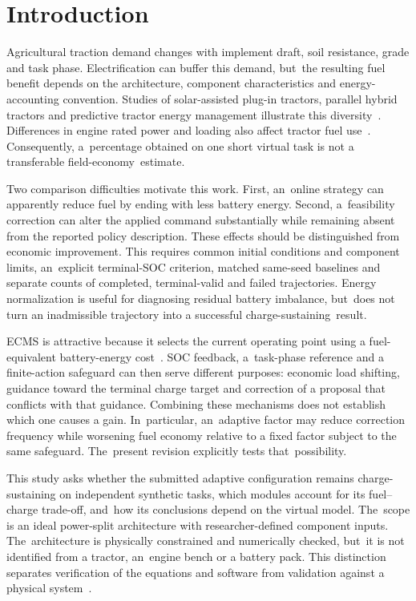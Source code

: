 \documentclass[energies,article,submit,moreauthors]{Definitions/mdpi}
\begin{document}
\section{Introduction}
Agricultural traction demand changes with implement draft, soil resistance, grade and task phase. Electrification can buffer this demand, but~the resulting fuel benefit depends on the architecture, component characteristics and energy-accounting convention. Studies of solar-assisted plug-in tractors, parallel hybrid tractors and predictive tractor energy management illustrate this diversity~\cite{mousazadeh2011,mocera2020,curiel2023}. Differences in engine rated power and loading also affect tractor fuel use~\cite{jilek2008,janulevicius2010}. Consequently, a~percentage obtained on one short virtual task is not a transferable field-economy~estimate.

Two comparison difficulties motivate this work. First, an~online strategy can apparently reduce fuel by ending with less battery energy. Second, a~feasibility correction can alter the applied command substantially while remaining absent from the reported policy description. These effects should be distinguished from economic improvement. This requires common initial conditions and component limits, an~explicit terminal-SOC criterion, matched same-seed baselines and separate counts of completed, terminal-valid and failed trajectories. Energy normalization is useful for diagnosing residual battery imbalance, but~does not turn an inadmissible trajectory into a successful charge-sustaining~result.

ECMS is attractive because it selects the current operating point using a fuel-equivalent battery-energy cost~\cite{musardo2005}. SOC feedback, a~task-phase reference and a finite-action safeguard can then serve different purposes: economic load shifting, guidance toward the terminal charge target and correction of a proposal that conflicts with that guidance. Combining these mechanisms does not establish which one causes a gain. In~particular, an~adaptive factor may reduce correction frequency while worsening fuel economy relative to a fixed factor subject to the same safeguard. The~present revision explicitly tests that~possibility.

This study asks whether the submitted adaptive configuration remains charge-sustaining on independent synthetic tasks, which modules account for its fuel--charge trade-off, and~how its conclusions depend on the virtual model. The~scope is an ideal power-split architecture with researcher-defined component inputs. The~architecture is physically constrained and numerically checked, but~it is not identified from a tractor, an~engine bench or a battery pack. This distinction separates verification of the equations and software from validation against a physical system~\cite{sargent2013}.
\end{document}
